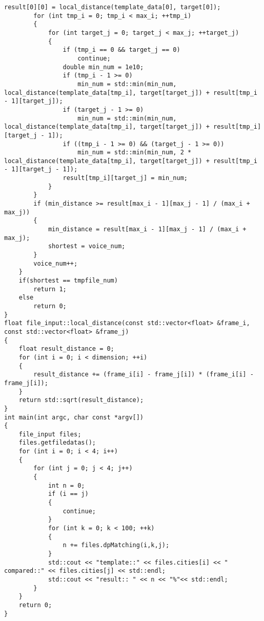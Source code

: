 \documentclass[dvipdfmx]{jsarticle}
\begin{document}
\begin{lstlisting}[caption=井上さんのプログラム,label=satoshi]
        result[0][0] = local_distance(template_data[0], target[0]);
        for (int tmp_i = 0; tmp_i < max_i; ++tmp_i)
        {
            for (int target_j = 0; target_j < max_j; ++target_j)
            {
                if (tmp_i == 0 && target_j == 0)
                    continue;
                double min_num = 1e10;
                if (tmp_i - 1 >= 0)
                    min_num = std::min(min_num, local_distance(template_data[tmp_i], target[target_j]) + result[tmp_i - 1][target_j]);
                if (target_j - 1 >= 0)
                    min_num = std::min(min_num, local_distance(template_data[tmp_i], target[target_j]) + result[tmp_i][target_j - 1]);
                if ((tmp_i - 1 >= 0) && (target_j - 1 >= 0))
                    min_num = std::min(min_num, 2 * local_distance(template_data[tmp_i], target[target_j]) + result[tmp_i - 1][target_j - 1]);
                result[tmp_i][target_j] = min_num;
            }
        }
        if (min_distance >= result[max_i - 1][max_j - 1] / (max_i + max_j))
        {
            min_distance = result[max_i - 1][max_j - 1] / (max_i + max_j);
            shortest = voice_num;
        }
        voice_num++;
    }
    if(shortest == tmpfile_num)
        return 1;
    else
        return 0;
}
float file_input::local_distance(const std::vector<float> &frame_i, const std::vector<float> &frame_j)
{
    float result_distance = 0;
    for (int i = 0; i < dimension; ++i)
    {
        result_distance += (frame_i[i] - frame_j[i]) * (frame_i[i] - frame_j[i]);
    }
    return std::sqrt(result_distance);
}
int main(int argc, char const *argv[])
{
    file_input files;
    files.getfiledatas();
    for (int i = 0; i < 4; i++)
    {
        for (int j = 0; j < 4; j++)
        {
            int n = 0;
            if (i == j)
            {
                continue;
            }
            for (int k = 0; k < 100; ++k)
            {
                n += files.dpMatching(i,k,j);
            }
            std::cout << "template::" << files.cities[i] << " compared::" << files.cities[j] << std::endl;
            std::cout << "result:: " << n << "%"<< std::endl;
        }
    }
    return 0;
}

\end{lstlisting}
\end{document}
